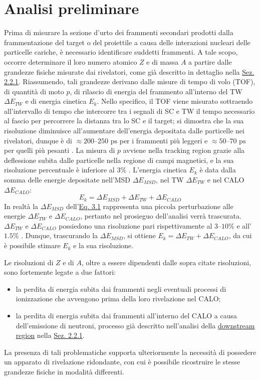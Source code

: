 \documentclass[12pt,a4paper,twoside]{report}
\begin{document}
	\section{Analisi preliminare}\label{sec:fragment_identification}
	Prima di misurare la sezione d'urto dei frammenti secondari prodotti dalla frammentazione del target o del proiettile a causa delle interazioni nucleari delle particelle cariche, è necessario identificare suddetti frammenti. A tale scopo, occorre determinare il loro numero atomico $Z$ e di massa $A$ a partire dalle grandezze fisiche misurate dai rivelatori, come già descritto in dettaglio nella \hyperref[sec:setupElettronico]{Sez. 2.2.1}. Riassumendo, tali grandezze derivano dalle misure di tempo di volo (TOF), di quantità di moto $p$, di rilascio di energia del frammento all'interno del TW $\Delta E_{TW}$ e di energia cinetica $E_k$. Nello specifico, il TOF viene misurato sottraendo all'intervallo di tempo che intercorre tra i segnali di SC e TW il tempo necessario al fascio per percorrere la distanza tra lo SC e il target; si dimostra che la sua risoluzione diminuisce all'aumentare dell'energia depositata dalle particelle nei rivelatori, dunque è di $\approx200$--$250\mbox{ ps}$ per i frammenti più leggeri e $\approx50$--$70\mbox{ ps}$ per quelli più pesanti \cite{foot_cdr}. La misura di $p$ avviene nella tracking region grazie alla deflessione subita dalle particelle nella regione di campi magnetici, e la sua risoluzione percentuale è inferiore al $3\%$ \cite{foot_cdr}. L'energia cinetica $E_k$ è data dalla somma delle energie depositate nell'MSD $\Delta E_{MSD}$, nel TW $\Delta E_{TW}$ e nel CALO $\Delta E_{CALO}$:
	\begin{equation}
		E_k=\Delta E_{MSD}+\Delta E_{TW}+\Delta E_{CALO}
		\label{eq:deposited_energy}
	\end{equation}
	In realtà la $\Delta E_{MSD}$ dell'\hyperref[eq:deposited_energy]{Eq. 3.1} rappresenta una piccola perturbazione alle energie $\Delta E_{TW}$ e $\Delta E_{CALO}$, pertanto nel prosieguo dell'analisi verrà trascurata. $\Delta E_{TW}$ e $\Delta E_{CALO}$ possiedono una risoluzione pari rispettivamente al $3$--$10\%$ e all'$1.5\%$ \cite{foot_cdr}. Dunque, trascurando la $\Delta E_{MSD}$, si ottiene $E_k=\Delta E_{TW}+\Delta E_{CALO}$, da cui è possibile stimare $E_k$ e la sua risoluzione.
	
	Le risoluzioni di $Z$ e di $A$, oltre a essere dipendenti dalle sopra citate risoluzioni, sono fortemente legate a due fattori:
	\begin{itemize}
		\item la perdita di energia subita dai frammenti negli eventuali processi di ionizzazione che avvengono prima della loro rivelazione nel CALO;
		\item la perdita di energia subita dai frammenti all'interno del CALO a causa dell'emissione di neutroni, processo già descritto nell'analisi della \hyperref[par:downstream_region]{downstream region} nella \hyperref[sec:setupElettronico]{Sez. 2.2.1}.
	\end{itemize}
	La presenza di tali problematiche supporta ulteriormente la necessità di possedere un apparato di rivelazione ridondante, con cui è possibile ricostruire le stesse grandezze fisiche in modalità differenti.
	
\end{document}
